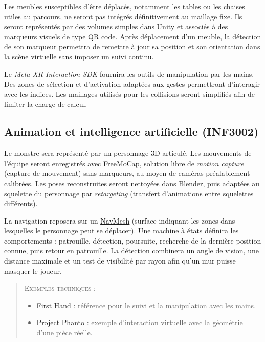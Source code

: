 \documentclass[11pt,a4paper]{article}
\newcommand{\doclink}[2]{\href{#1}{\textcolor{linkBlue}{\underline{#2}}}}
\begin{document}
Les meubles susceptibles d'être déplacés, notamment les tables ou les chaises utiles au parcours, ne seront pas intégrés définitivement au maillage fixe. Ils seront représentés par des volumes simples dans Unity et associés à des marqueurs visuels de type QR code. Après déplacement d'un meuble, la détection de son marqueur permettra de remettre à jour sa position et son orientation dans la scène virtuelle sans imposer un suivi continu.

Le \emph{Meta XR Interaction SDK} fournira les outils de manipulation par les mains. Des zones de sélection et d'activation adaptées aux gestes permettront d'interagir avec les indices. Les maillages utilisés pour les collisions seront simplifiés afin de limiter la charge de calcul.

\subsection{Animation et intelligence artificielle (INF3002)}

Le monstre sera représenté par un personnage 3D articulé. Les mouvements de l'équipe seront enregistrés avec \doclink{https://github.com/freemocap/freemocap}{FreeMoCap}, solution libre de \emph{motion capture} (capture de mouvement) sans marqueurs, au moyen de caméras préalablement calibrées. Les poses reconstruites seront nettoyées dans Blender, puis adaptées au squelette du personnage par \emph{retargeting} (transfert d'animations entre squelettes différents).

La navigation reposera sur un \doclink{https://developers.meta.com/vr/documentation/unity/unity-sample-mruk-navmesh/}{NavMesh} (surface indiquant les zones dans lesquelles le personnage peut se déplacer). Une machine à états définira les comportements : patrouille, détection, poursuite, recherche de la dernière position connue, puis retour en patrouille. La détection combinera un angle de vision, une distance maximale et un test de visibilité par rayon afin qu'un mur puisse masquer le joueur.

\begin{quote}
    \small
    \noindent\textsc{Exemples techniques :}
    \begin{itemize}[leftmargin=1.5em,itemsep=0.28em,topsep=0.35em]
        \item \doclink{https://github.com/oculus-samples/Unity-FirstHand}{First Hand} : référence pour le suivi et la manipulation avec les mains.
        \item \doclink{https://github.com/oculus-samples/Unity-Phanto}{Project Phanto} : exemple d'interaction virtuelle avec la géométrie d'une pièce réelle.
    \end{itemize}
\end{quote}
\end{document}
